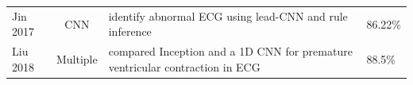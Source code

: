 \documentclass[journal]{IEEEtran}
\begin{document}
\begin{table}[!t]
\begin{minipage}{\textwidth}
\begin{tabularx}{\textwidth}{l c l l}
			Jin 2017\cite{jin2017classification}           & CNN            & identify abnormal ECG using lead-CNN and rule inference                                                    & 86.22\%                                                                                                                                                                                                                                                                                                                                                                                                                                                                                                                                                                                                                                                                                                                                                                                                                                                                                                  \\
			Liu 2018\cite{liu2018detecting}                & Multiple       & compared Inception and a 1D CNN for premature ventricular contraction in ECG                               & 88.5\%                                                                                                                                                                                                                                                                                                                                                                                                                                                                                                                                                                                                                                                                                                                                                                                                                                                                                                   \\

\end{tabularx}
\end{minipage}
\end{table}
\end{document}
